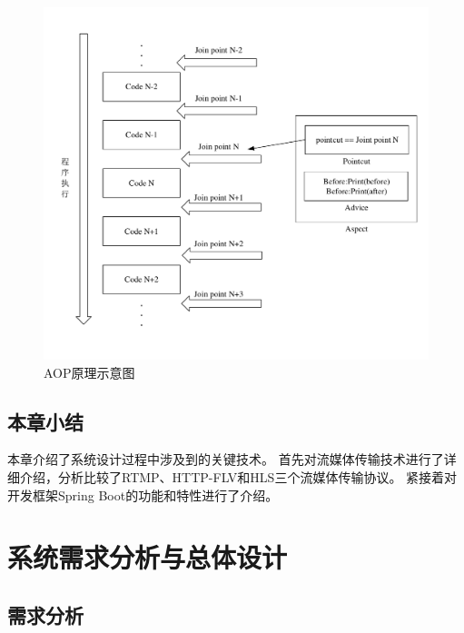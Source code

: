 \begin{figure}[ht]
    \centering   
    \includegraphics[width=.8\linewidth]{./Figure/IMG_aop.pdf}
    \caption{AOP原理示意图}\label{Fig:aop}
\end{figure}


\section{本章小结}
本章介绍了系统设计过程中涉及到的关键技术。
首先对流媒体传输技术进行了详细介绍，分析比较了RTMP、HTTP-FLV和HLS三个流媒体传输协议。
紧接着对开发框架Spring Boot的功能和特性进行了介绍。
\chapter{系统需求分析与总体设计}

\section{需求分析}


